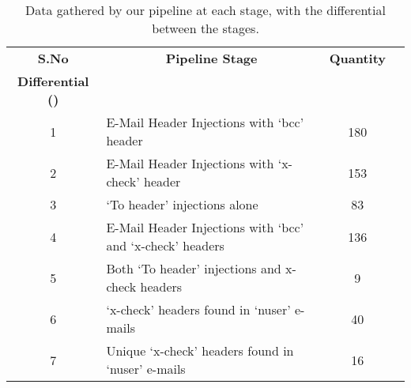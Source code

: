 \begin{table}[!htbp]
	\centering
	\begin{tabular}{|c|l|c|c|}
		\hline
		\multicolumn{1}{|c|}{\textbf{S.No}} &
		\multicolumn{1}{c|}{\textbf{Pipeline Stage}} &
		\multicolumn{1}{p{3cm}|}{\centering \textbf{Quantity}}\\
		\multicolumn{1}{p{3cm}|}{\centering \textbf{Differential (\Delta)}}\\
		
		\hline
		1 & E-Mail Header Injections with `bcc' header & 180\\
		\hline
		2 & E-Mail Header Injections with `x-check' header & 153\\
		\hline
		3 & `To header' injections alone & 83\\
		\hline
		4 & E-Mail Header Injections with `bcc' and `x-check' headers & 136\\
		\hline
		5 & Both `To header' injections and x-check headers & 9\\
		\hline
		6 & `x-check' headers found in `nuser' e-mails & 40\\
		\hline
		7 & Unique `x-check' headers found in `nuser' e-mails & 16\\
		\hline
	\end{tabular}
	\caption[Data gathered by our pipeline]{Data gathered by our pipeline at each stage, with the differential between the stages.}
	\label{tab:pipeline}
\end{table}
